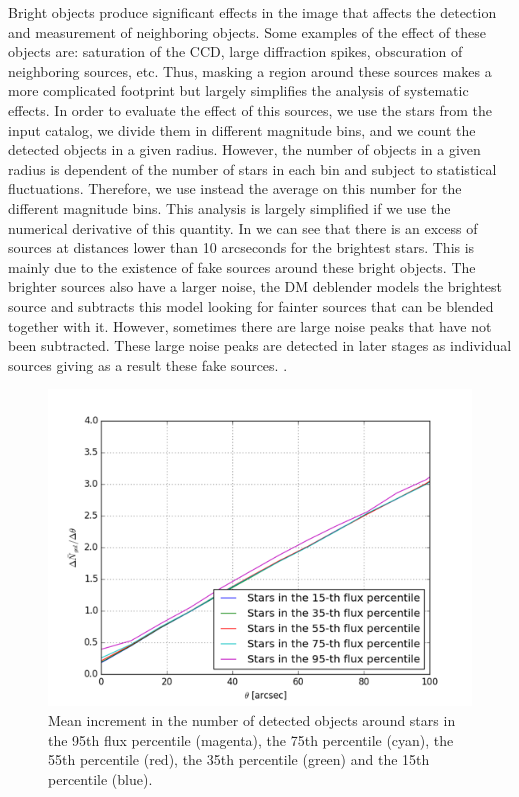 \documentclass[\docopts]{\docclass}
\begin{document}
Bright objects produce significant effects in the image that affects the detection and measurement of neighboring objects. Some examples of the effect of these objects are: saturation of the CCD, large diffraction spikes, obscuration of neighboring sources, etc. Thus, masking a region around these sources makes a more complicated footprint but largely simplifies the analysis of systematic effects. In order to evaluate the effect of this sources, we use the stars from the input catalog, we divide them in different magnitude bins, and we count the detected objects in a given radius.  However, the number of objects in a given radius is dependent of the number of stars in each bin and subject to statistical fluctuations. Therefore, we use instead the average on this number for the different magnitude bins. This analysis is largely simplified if we use the numerical derivative of this quantity. In  we can see that there is an excess of sources at distances lower than 10 arcseconds for the brightest stars. This is mainly due to the existence of fake sources around these bright objects. The brighter sources also have a larger noise, the DM deblender models the brightest source and subtracts this model looking for fainter sources that can be blended together with it. However, sometimes there are large noise peaks that have not been subtracted. These large noise peaks are detected in later stages as individual sources giving as a result these fake sources. .

\begin{figure}
\centering
\includegraphics[width=0.9\columnwidth]{dngal_dtheta.png}
\caption{Mean increment in the number of detected objects around stars in the 95th flux percentile (magenta), the 75th percentile (cyan), the 55th percentile (red), the 35th percentile (green) and the 15th percentile (blue).}
\label{fig:galdens_derivative}
\end{figure}
\end{document}
